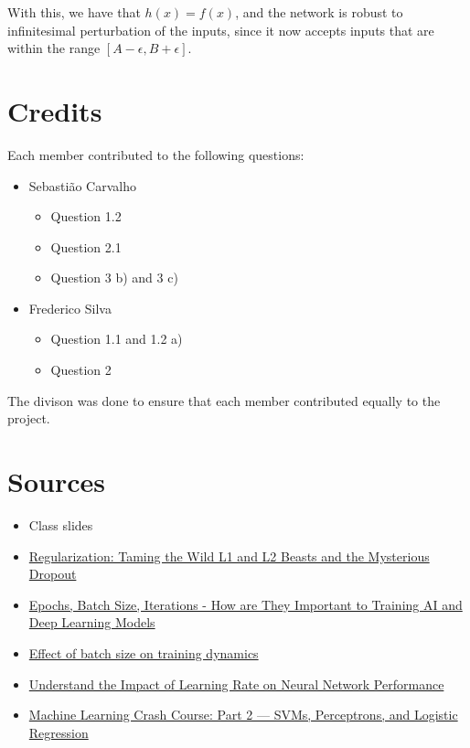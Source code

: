\documentclass{article}
\begin{document}
With this, we have that \(h(x) = f(x)\), and the network is robust to infinitesimal perturbation of the inputs, since it now accepts inputs
that are within the range \([A - \epsilon, B + \epsilon]\).

\section{Credits}

Each member contributed to the following questions:

\begin{itemize}
    \item Sebastião Carvalho 
    \begin{itemize}
        \item Question 1.2
        \item Question 2.1
        \item Question 3 b) and 3 c)
    \end{itemize}
    \item Frederico Silva
    \begin{itemize}
        \item Question 1.1 and 1.2 a)
        \item Question 2
    \end{itemize}
\end{itemize}

\smallskip

The divison was done to ensure that each member contributed equally to the project.

\section{Sources}

\begin{itemize}
    \item Class slides
    \item \href{https://www.quora.com/What-is-the-difference-between-L1-and-L2-regularization-How-
    does-it-solve-the-problem-of-overfitting-Which-regularizer-to-use-and-when}{Regularization: Taming the Wild 
    L1 and L2 Beasts and the Mysterious Dropout}
    \item \href{https://www.sabrepc.com/blog/Deep-Learning-and-AI/Epochs-Batch-Size-Iterations}
    {Epochs, Batch Size, Iterations - How are They Important to Training AI and Deep Learning Models}
    \item \href{https://medium.com/mini-distill/effect-of-batch-size-on-training-dynamics-21c14f7a716e}
    {Effect of batch size on training dynamics}
    \item \href{https://machinelearningmastery.com/understand-the-dynamics-of-learning-rate-on-deep-learning-neural-networks/}
    {Understand the Impact of Learning Rate on Neural Network Performance}
    \item \href{https://medium.com/@ml.at.berkeley/machine-learning-crash-course-part-2-3046b4a7f943}
    {Machine Learning Crash Course: Part 2 — SVMs, Perceptrons, and Logistic Regression}
\end{itemize}
\end{document}
